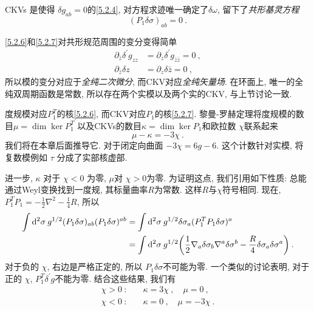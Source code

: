 CKVs 是使得 $\delta g_{a b}=0 $的\eqref{5.2.4}, 对方程求迹唯一确定了$\delta \omega$, 留下了\emph{共形基灵方程}
\begin{equation}
	(P_{1} \delta \sigma )_{a b}=0 \:. \label{5.2.7}
\end{equation}

\eqref{5.2.6}和\eqref{5.2.7}对共形规范周围的变分变得简单
\begin{subequations} \label{5.2.8}
\begin{align}
\partial_{\bar{z}} \delta^{\prime} g_{z z} &=\partial_{z} \delta^{\prime} g_{\bar{z} \bar{z}}=0 \:, \label{5.2.8a} \\
\partial_{\bar{z}} \delta z &=\partial_{z} \delta \bar{z}=0 \:, \label{5.2.8b}
\end{align}			
\end{subequations}
所以模的变分对应于\emph{全纯二次微分}, 而CKV对应\emph{全纯矢量场}. 在环面上, 唯一的全纯双周期函数是常数, 所以存在两个实模以及两个实的CKV, 与上节讨论一致.

度规模对应$P_{1}^{T}$的核\eqref{5.2.6}, 而CKV对应$P_{1}$的核\eqref{5.2.7}. 黎曼-罗赫定理将度规模的数目$\mu=\operatorname{dim} \operatorname{ker} P_{1}^{T}$ 以及CKVs的数目$ \kappa=\operatorname{dim} \operatorname{ker} P_{1}$和欧拉数 $\chi$联系起来
\begin{equation}
	\mu-\kappa=-3 \chi \:. \label{5.2.9}
\end{equation}
我们将在本章后面推导它. 对于闭定向曲面 $-3 \chi=6 g-6 $. 这个计数针对实模, 将复数模例如 $\tau$ 分成了实部核虚部.

进一步, $\kappa$ 对于 $\chi<0$ 为零,  $\mu$对 $\chi>0 $为零. 为证明这点, 我们引用如下性质: 总能通过Weyl变换找到一度规, 其标量曲率$R$为常数. 
这样$R$与$\chi$符号相同. 现在, $P_{1}^{T} P_{1}=-\frac{1}{2} \nabla^{2}-\frac{1}{4} R$, 所以
	\begin{align}
		  \int \mathrm{d}^{2} \sigma \: g^{1 / 2} (P_{1} \delta \sigma)_{a b}(P_{1} \delta \sigma)^{a b} 
		&=\int \mathrm{d}^{2} \sigma \: g^{1 / 2} \delta \sigma_{a}(P_{1}^{T} P_{1} \delta \sigma)^{a}  \nonumber \\
		&=\int \mathrm{d}^{2} \sigma \: g^{1 / 2} \biggl(\frac{1}{2} \nabla_{a} \delta \sigma_{b} \nabla^{a} \delta \sigma^{b}-\frac{R}{4} \delta \sigma_{a} \delta \sigma^{a}\biggr) \:. \label{5.2.10}
	\end{align}
对于负的 $\chi$, 右边是严格正定的, 所以 $P_{1} \delta \sigma$不可能为零. 一个类似的讨论表明, 对于正的 $\chi$,  $P_{1}^{T} \delta^{\prime} g$不能为零. 结合这些结果, 我们有
\begin{subequations} \label{5.2.11}
\begin{align}
\chi>0\:: &\quad  \kappa=3 \chi\:, \quad \mu=0 \:, \label{5.2.11a} \\
\chi<0\:: &\quad \kappa=0\:, \quad \mu=-3 \chi \:. \label{5.2.11b}
\end{align}						
\end{subequations}

